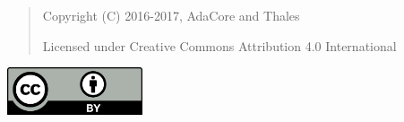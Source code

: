 \bigskip
\begin{quote}
   Copyright (C) 2016-2017, AdaCore and Thales

   Licensed under Creative Commons Attribution 4.0 International
\end{quote}

\includegraphics[width=4cm]{_static/licence-cc-by.png}
\bigskip
